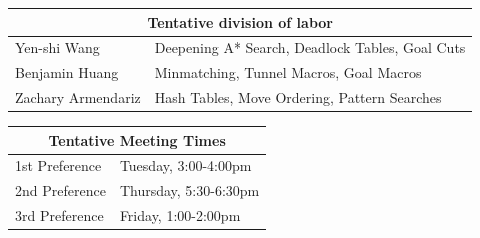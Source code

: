 \documentclass[10pt, notitlepage]{article}
\begin{document}
\begin{table}[!htb]
    \begin{minipage}{.6\linewidth}
      \centering
        \begin{tabular}{|l|l|}
            \hline
            \multicolumn{2}{|c|}{Tentative division of labor} \\
            \hline\hline
            Yen-shi Wang              &Deepening A* Search, Deadlock Tables, Goal Cuts\\
            Benjamin Huang            & Minmatching, Tunnel Macros, Goal Macros\\
            Zachary Armendariz \quad  & Hash Tables, Move Ordering, Pattern Searches \\
            \hline
        \end{tabular}
    \end{minipage}%
    \begin{minipage}{.4\linewidth}
        \centering
        \begin{tabular}{|l|l|}
            \hline
            \multicolumn{2}{|c|}{Tentative Meeting Times} \\
            \hline\hline
            1st Preference &Tuesday, 3:00-4:00pm \\
            2nd Preference &Thursday, 5:30-6:30pm \\
            3rd Preference &Friday, 1:00-2:00pm \\
            \hline
        \end{tabular}
    \end{minipage} 
\end{table}
    
\end{document}
